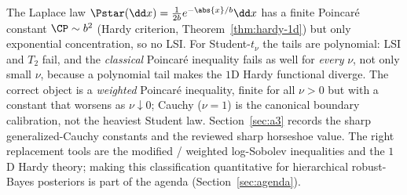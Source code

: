 \documentclass[../main.tex]{subfiles}
\begin{document}
\noindent The Laplace law $\Pstar(\dd x)=\tfrac1{2b}e^{-\abs{x}/b}\dd x$ has a finite
Poincar\'e constant $\CP\sim b^2$ (Hardy criterion, Theorem~\ref{thm:hardy-1d}) but only
exponential concentration, so no LSI. For Student-$t_\nu$ the tails are polynomial: LSI and
$T_2$ fail, and the \emph{classical} Poincar\'e inequality fails as well for \emph{every}
$\nu$, not only small $\nu$, because a polynomial tail makes the $1$D Hardy functional diverge.
The correct object is a \emph{weighted} Poincar\'e inequality, finite for all $\nu>0$ but with a
constant that worsens as $\nu\downarrow0$; Cauchy ($\nu=1$) is the canonical boundary calibration,
not the heaviest Student law. Section~\ref{sec:a3} records the sharp generalized-Cauchy constants
and the reviewed sharp horseshoe value. The right replacement tools
are the modified / weighted log-Sobolev inequalities and the $1$D Hardy theory; making this
classification quantitative for hierarchical robust-Bayes posteriors is part of the agenda
(Section~\ref{sec:agenda}).
\end{document}
